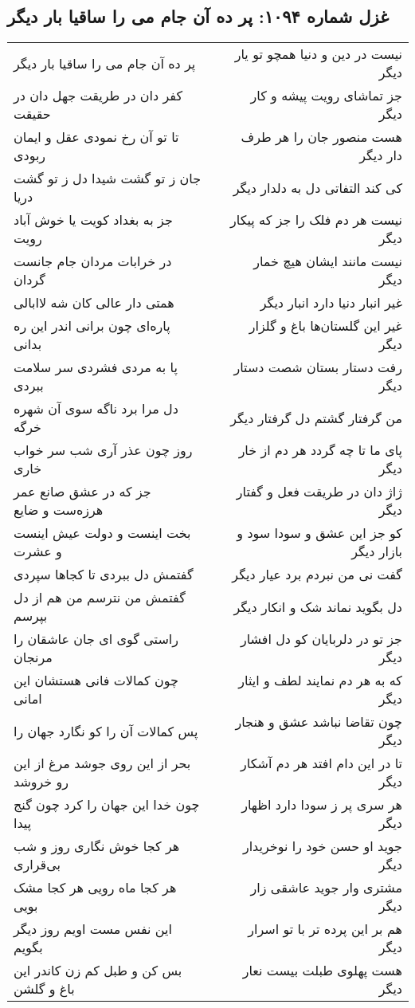 \begin{center}
\section*{غزل شماره ۱۰۹۴: پر ده آن جام می را ساقیا بار دیگر}
\label{sec:1094}
\begin{longtable}{l p{0.5cm} r}
پر ده آن جام می را ساقیا بار دیگر
&&
نیست در دین و دنیا همچو تو یار دیگر
\\
کفر دان در طریقت جهل دان در حقیقت
&&
جز تماشای رویت پیشه و کار دیگر
\\
تا تو آن رخ نمودی عقل و ایمان ربودی
&&
هست منصور جان را هر طرف دار دیگر
\\
جان ز تو گشت شیدا دل ز تو گشت دریا
&&
کی کند التفاتی دل به دلدار دیگر
\\
جز به بغداد کویت یا خوش آباد رویت
&&
نیست هر دم فلک را جز که پیکار دیگر
\\
در خرابات مردان جام جانست گردان
&&
نیست مانند ایشان هیچ خمار دیگر
\\
همتی دار عالی کان شه لاابالی
&&
غیر انبار دنیا دارد انبار دیگر
\\
پاره‌ای چون برانی اندر این ره بدانی
&&
غیر این گلستان‌ها باغ و گلزار دیگر
\\
پا به مردی فشردی سر سلامت ببردی
&&
رفت دستار بستان شصت دستار دیگر
\\
دل مرا برد ناگه سوی آن شهره خرگه
&&
من گرفتار گشتم دل گرفتار دیگر
\\
روز چون عذر آری شب سر خواب خاری
&&
پای ما تا چه گردد هر دم از خار دیگر
\\
جز که در عشق صانع عمر هرزه‌ست و ضایع
&&
ژاژ دان در طریقت فعل و گفتار دیگر
\\
بخت اینست و دولت عیش اینست و عشرت
&&
کو جز این عشق و سودا سود و بازار دیگر
\\
گفتمش دل ببردی تا کجاها سپردی
&&
گفت نی من نبردم برد عیار دیگر
\\
گفتمش من نترسم من هم از دل بپرسم
&&
دل بگوید نماند شک و انکار دیگر
\\
راستی گوی ای جان عاشقان را مرنجان
&&
جز تو در دلربایان کو دل افشار دیگر
\\
چون کمالات فانی هستشان این امانی
&&
که به هر دم نمایند لطف و ایثار دیگر
\\
پس کمالات آن را کو نگارد جهان را
&&
چون تقاضا نباشد عشق و هنجار دیگر
\\
بحر از این روی جوشد مرغ از این رو خروشد
&&
تا در این دام افتد هر دم آشکار دیگر
\\
چون خدا این جهان را کرد چون گنج پیدا
&&
هر سری پر ز سودا دارد اظهار دیگر
\\
هر کجا خوش نگاری روز و شب بی‌قراری
&&
جوید او حسن خود را نوخریدار دیگر
\\
هر کجا ماه رویی هر کجا مشک بویی
&&
مشتری وار جوید عاشقی زار دیگر
\\
این نفس مست اویم روز دیگر بگویم
&&
هم بر این پرده تر با تو اسرار دیگر
\\
بس کن و طبل کم زن کاندر این باغ و گلشن
&&
هست پهلوی طبلت بیست نعار دیگر
\\
\end{longtable}
\end{center}
